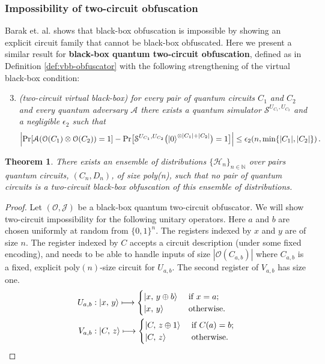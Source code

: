 \documentclass[11pt]{article}
\numberwithin{equation}{section}
\newtheorem{theorem}{Theorem}
\newcommand{\algo}{\mathcal}
\begin{document}
{\subsubsection{Impossibility of two-circuit obfuscation}\label{sec-twocircuit}
Barak et. al. \cite{BGIRSVY12} shows that black-box obfuscation is impossible by showing an explicit circuit family that cannot be black-box obfuscated.  Here we present a similar result for {\bf black-box quantum two-circuit obfuscation},  defined as in Definition \ref{def:vbb-obfuscator}  with the following strengthening of the virtual black-box condition:
\begin{enumerate}
\setcounter{enumi}{2}
\item \emph{(two-circuit virtual black-box) for every pair of quantum circuits $C_1$ and $C_2$ and every quantum adversary $\mathcal A$ there exists a quantum simulator $\mathcal S^{U_{C_1}, U_{C_2}}$ and a negligible $\epsilon_2$ such that}
$$
\Bigl| \text{Pr}[\mathcal A(\mathcal O(C_1) \otimes \mathcal O(C_2)) = 1] - \text{Pr}\bigl[\mathcal S^{U_{C_1}, U_{C_2}}\bigl({\left\vert{0}\right\rangle}^{\otimes |C_1| + |C_2|}\bigr) = 1\bigr] \Bigr| \leq \epsilon_2(n, \min\{|C_1|,|C_2|\})\,.
$$
\end{enumerate}
\begin{theorem}
There exists an ensemble of distributions $\lbrace\mathcal{H}_n\rbrace_{n\in\mathbb{N}}$ over pairs quantum circuits, $(C_n, D_n)$, of size poly(n), such that no pair of quantum circuits is a two-circuit black-box obfuscation of this ensemble of distributions.
\end{theorem}
\begin{proof}
Let $(\mathcal O, \mathcal J)$ be a black-box quantum two-circuit obfuscator. 
We will show two-circuit impossibility for the following unitary operators. Here $a$ and $b$ are chosen uniformly at random from $\{0,1\}^n$.  The registers indexed by $x$ and $y$ are of size $n$. The register indexed by $C$ accepts a circuit description (under some fixed encoding), and needs to be able to handle inputs of size $|\algo O(C_{a, b})|$ where $C_{a, b}$ is a fixed, explicit poly$(n)$-size circuit for $U_{a, b}$. The second register of $V_{a, b}$ has size one.
\begin{align}\label{eq:pair-impossible}
U_{a, b} &: {\left\vert{x,\, y}\right\rangle} \longmapsto
\begin{cases}
{\left\vert{x,\, y \oplus b}\right\rangle} &\text{ if } x = a;\\
{\left\vert{x,\, y}\right\rangle} &\text{ otherwise}.
\end{cases}\\
V_{a, b} &: {\left\vert{C,\, z}\right\rangle} \longmapsto
\begin{cases}
{\left\vert{C,\, z \oplus 1}\right\rangle} &\text{ if } C(a) = b;\\
{\left\vert{C,\, z}\right\rangle} &\text{ otherwise}.
\end{cases}
\end{align}


\end{proof}}
\end{document}
